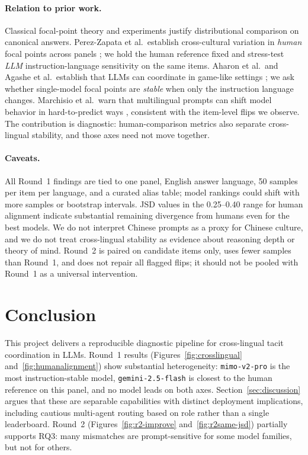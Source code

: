 \documentclass[11pt]{article}
\begin{document}
\paragraph{Relation to prior work.}
Classical focal-point theory and experiments \cite{schelling1960,mehta1994,sugden1995} justify distributional comparison on canonical answers. Perez-Zapata et al.\ establish cross-cultural variation in \emph{human} focal points across panels \cite{perez2026}; we hold the human reference fixed and stress-test \emph{LLM} instruction-language sensitivity on the same items. Aharon et al.\ and Agashe et al.\ establish that LLMs can coordinate in game-like settings \cite{aharon2026,agashe2025coord}; we ask whether single-model focal points are \emph{stable} when only the instruction language changes. Marchisio et al.\ warn that multilingual prompts can shift model behavior in hard-to-predict ways \cite{marchisio2024language}, consistent with the item-level flips we observe. The contribution is diagnostic: human-comparison metrics also separate cross-lingual stability, and those axes need not move together.

\paragraph{Caveats.}
All Round~1 findings are tied to one panel, English answer language, 50 samples per item per language, and a curated alias table; model rankings could shift with more samples or bootstrap intervals. JSD values in the 0.25--0.40 range for human alignment indicate substantial remaining divergence from humans even for the best models. We do not interpret Chinese prompts as a proxy for Chinese culture, and we do not treat cross-lingual stability as evidence about reasoning depth or theory of mind. Round~2 is paired on candidate items only, uses fewer samples than Round~1, and does not repair all flagged flips; it should not be pooled with Round~1 as a universal intervention.

\section{Conclusion}
\label{sec:conclusion}

This project delivers a reproducible diagnostic pipeline for cross-lingual tacit coordination in LLMs. Round~1 results (Figures~\ref{fig:crosslingual} and~\ref{fig:humanalignment}) show substantial heterogeneity: \texttt{mimo-v2-pro} is the most instruction-stable model, \texttt{gemini-2.5-flash} is closest to the human reference on this panel, and no model leads on both axes. Section~\ref{sec:discussion} argues that these are separable capabilities with distinct deployment implications, including cautious multi-agent routing based on role rather than a single leaderboard. Round~2 (Figures~\ref{fig:r2-improve} and~\ref{fig:r2same-jsd}) partially supports RQ3: many mismatches are prompt-sensitive for some model families, but not for others.
\end{document}

